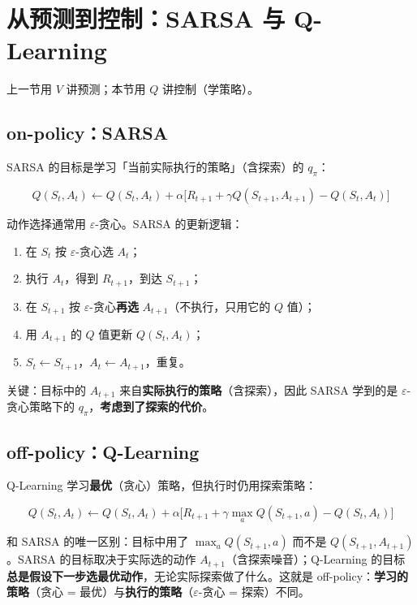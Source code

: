 \documentclass{article}
\begin{document}
\section*{从预测到控制：SARSA 与 Q-Learning}

上一节用 $V$ 讲预测；本节用 $Q$ 讲控制（学策略）。

\subsection*{on-policy：SARSA}

SARSA 的目标是学习「当前实际执行的策略」（含探索）的 $q_\pi$：

\[
\boxed{Q(S_t,A_t) \leftarrow Q(S_t,A_t) + \alpha\bigl[R_{t+1} + \gamma Q(S_{t+1},A_{t+1}) - Q(S_t,A_t)\bigr]}
\]

动作选择通常用 $\varepsilon$-贪心。SARSA 的更新逻辑：
\begin{enumerate}
  \item 在 $S_t$ 按 $\varepsilon$-贪心选 $A_t$；
  \item 执行 $A_t$，得到 $R_{t+1}$，到达 $S_{t+1}$；
  \item 在 $S_{t+1}$ 按 $\varepsilon$-贪心\textbf{再选} $A_{t+1}$（不执行，只用它的 $Q$ 值）；
  \item 用 $A_{t+1}$ 的 $Q$ 值更新 $Q(S_t,A_t)$；
  \item $S_t \leftarrow S_{t+1}$，$A_t \leftarrow A_{t+1}$，重复。
\end{enumerate}

关键：目标中的 $A_{t+1}$ 来自\textbf{实际执行的策略}（含探索），因此 SARSA 学到的是 $\varepsilon$-贪心策略下的 $q_\pi$，\textbf{考虑到了探索的代价}。

\subsection*{off-policy：Q-Learning}

Q-Learning 学习\textbf{最优}（贪心）策略，但执行时仍用探索策略：

\[
\boxed{Q(S_t,A_t) \leftarrow Q(S_t,A_t) + \alpha\bigl[R_{t+1} + \gamma \max_a Q(S_{t+1},a) - Q(S_t,A_t)\bigr]}
\]

和 SARSA 的唯一区别：目标中用了 $\max_a Q(S_{t+1},a)$ 而不是 $Q(S_{t+1},A_{t+1})$。SARSA 的目标取决于实际选的动作 $A_{t+1}$（含探索噪音）；Q-Learning 的目标\textbf{总是假设下一步选最优动作}，无论实际探索做了什么。这就是 off-policy：\textbf{学习的策略}（贪心 = 最优）与\textbf{执行的策略}（$\varepsilon$-贪心 = 探索）不同。
\end{document}
